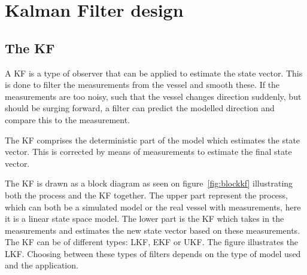 \section{Kalman Filter design}
\label{sec:kfdesign}

\subsection{The \acl{KF}}



A \ac{KF} is a type of observer that can be applied to estimate the state vector. This is done to filter the measurements from the vessel and smooth these. If the measurements are too noisy, such that the vessel changes direction suddenly, but should be surging forward, a filter can predict the modelled direction and compare this to the measurement.

The \ac{KF} comprises the deterministic part  of the model which estimates the state vector. This is corrected by means of measurements to estimate the final state vector.

The \ac{KF} is drawn as a block diagram as seen on figure~\vref{fig:blockkf} illustrating both the process and the \ac{KF} together. The upper part represent the process, which can both be a simulated model or the real vessel with measurements, here it is a linear state space model. The lower part is the \ac{KF} which takes in the measurements and estimates the new state vector based on these measurements. The \ac{KF} can be of different types: \ac{LKF}, \ac{EKF} or \ac{UKF}. The figure illustrates the \ac{LKF}. Choosing between these types of filters depends on the type of model used and the application. 


